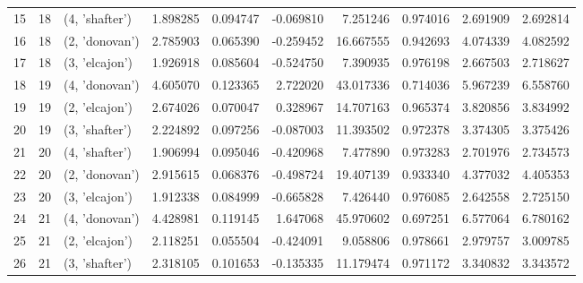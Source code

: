 \begin{tabular}{lrlrrrrrrr}
15 &     18 &  (4, 'shafter') &  1.898285 &  0.094747 & -0.069810 &   7.251246 &  0.974016 &  2.691909 &  2.692814 \\
16 &     18 &  (2, 'donovan') &  2.785903 &  0.065390 & -0.259452 &  16.667555 &  0.942693 &  4.074339 &  4.082592 \\
17 &     18 &  (3, 'elcajon') &  1.926918 &  0.085604 & -0.524750 &   7.390935 &  0.976198 &  2.667503 &  2.718627 \\
18 &     19 &  (4, 'donovan') &  4.605070 &  0.123365 &  2.722020 &  43.017336 &  0.714036 &  5.967239 &  6.558760 \\
19 &     19 &  (2, 'elcajon') &  2.674026 &  0.070047 &  0.328967 &  14.707163 &  0.965374 &  3.820856 &  3.834992 \\
20 &     19 &  (3, 'shafter') &  2.224892 &  0.097256 & -0.087003 &  11.393502 &  0.972378 &  3.374305 &  3.375426 \\
21 &     20 &  (4, 'shafter') &  1.906994 &  0.095046 & -0.420968 &   7.477890 &  0.973283 &  2.701976 &  2.734573 \\
22 &     20 &  (2, 'donovan') &  2.915615 &  0.068376 & -0.498724 &  19.407139 &  0.933340 &  4.377032 &  4.405353 \\
23 &     20 &  (3, 'elcajon') &  1.912338 &  0.084999 & -0.665828 &   7.426440 &  0.976085 &  2.642558 &  2.725150 \\
24 &     21 &  (4, 'donovan') &  4.428981 &  0.119145 &  1.647068 &  45.970602 &  0.697251 &  6.577064 &  6.780162 \\
25 &     21 &  (2, 'elcajon') &  2.118251 &  0.055504 & -0.424091 &   9.058806 &  0.978661 &  2.979757 &  3.009785 \\
26 &     21 &  (3, 'shafter') &  2.318105 &  0.101653 & -0.135335 &  11.179474 &  0.971172 &  3.340832 &  3.343572 \\
\bottomrule
\end{tabular}
